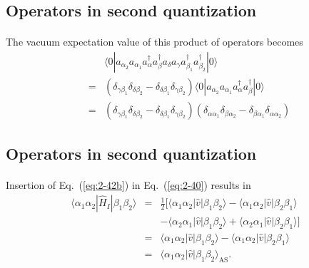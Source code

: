 \documentclass[%
twoside,                 %
final,                   %
10pt]{article}
\begin{document}
\subsection{Operators in second quantization}

\paragraph{}
The vacuum expectation value of this product of operators becomes
\begin{eqnarray}
	&& \langle 0|a_{\alpha_2} a_{\alpha_1} a^{\dagger}_\alpha a^{\dagger}_\beta a_\delta a_\gamma 
		a_{\beta_1}^{\dagger} a_{\beta_2}^{\dagger}|0\rangle \nonumber \\
	&=& (\delta_{\gamma \beta_1} \delta_{\delta \beta_2} -
		\delta_{\delta \beta_1} \delta_{\gamma \beta_2} ) 
		\langle 0|a_{\alpha_2} a_{\alpha_1}a^{\dagger}_\alpha a^{\dagger}_\beta|0\rangle \nonumber \\
	&=& (\delta_{\gamma \beta_1} \delta_{\delta \beta_2} -\delta_{\delta \beta_1} \delta_{\gamma \beta_2} )
	(\delta_{\alpha \alpha_1} \delta_{\beta \alpha_2} -\delta_{\beta \alpha_1} \delta_{\alpha \alpha_2} ) \label{eq:2-42b}
\end{eqnarray}





\subsection{Operators in second quantization}

\paragraph{}
Insertion of 
Eq.~(\ref{eq:2-42b}) in Eq.~(\ref{eq:2-40}) results in
\begin{eqnarray}
	\langle \alpha_1\alpha_2|\hat{H}_I|\beta_1\beta_2\rangle &=& \frac{1}{2} \big[ 
		\langle \alpha_1\alpha_2|\hat{v}|\beta_1\beta_2\rangle- \langle \alpha_1\alpha_2|\hat{v}|\beta_2\beta_1\rangle \nonumber \\
		&& - \langle \alpha_2\alpha_1|\hat{v}|\beta_1\beta_2\rangle + \langle \alpha_2\alpha_1|\hat{v}|\beta_2\beta_1\rangle \big] \nonumber \\
	&=& \langle \alpha_1\alpha_2|\hat{v}|\beta_1\beta_2\rangle - \langle \alpha_1\alpha_2|\hat{v}|\beta_2\beta_1\rangle \nonumber \\
	&=& \langle \alpha_1\alpha_2|\hat{v}|\beta_1\beta_2\rangle_{\mathrm{AS}}. \label{eq:2-43b}
\end{eqnarray}
\end{document}
